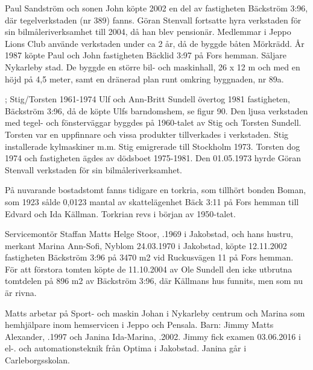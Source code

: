 Paul Sandström och sonen John köpte 2002 en del av fastigheten Bäckström 3:96, där tegelverkstaden (nr 389) fanns. Göran Stenvall fortsatte hyra	verkstaden för sin bilmåleriverksamhet till 2004, då han blev pensionär. Medlemmar i Jeppo Lions Club använde verkstaden under ca 2 år, då de 	byggde båten Mörkrädd. År 1987 köpte Paul och John fastigheten Bäcklid 3:97 på Fors hemman. Säljare Nykarleby stad. De byggde en större bil- och maskinhall, 26 x 12 m och med en höjd på 4,5 meter, samt en dränerad plan runt omkring byggnaden, nr 89a.

; Stig/Torsten	1961-1974
Ulf och Ann-Britt Sundell övertog 1981 fastigheten, Bäckström 3:96, då de köpte Ulfs barndomshem, se figur 90. Den ljusa verkstaden med 	tegel- och fönsterväggar byggdes på 1960-talet av Stig och Torsten Sundell. Torsten var en uppfinnare och vissa produkter tillverkades i 	verkstaden. Stig installerade kylmaskiner m.m. Stig emigrerade till Stockholm 1973. Torsten dog 1974 och fastigheten ägdes av dödsboet 	1975-1981. Den 01.05.1973 hyrde Göran Stenvall verkstaden för sin 	bilmåleriverksamhet.

På nuvarande bostadstomt fanns tidigare en torkria, som tillhört bonden	Boman, som 1923 sålde 0,0123 mantal av skattelägenhet Bäck 3:11 på 	Fors hemman till Edvard och Ida Källman. Torkrian revs i början av	1950-talet.



Servicemontör Staffan Matts Helge Stoor, .1969 i Jakobstad,	och hans hustru, merkant  Marina Ann-Sofi, \textborn Nyblom 24.03.1970 i Jakobstad, köpte 12.11.2002 fastigheten Bäckström 3:96 på 3470	m2  vid Ruckusvägen 11 på Fors hemman. För att förstora tomten köpte de 11.10.2004 av Ole Sundell den icke utbrutna tomtdelen på 896 m2 av Bäckström 3:96, där Källmans hus funnits, men som nu är rivna.


Matts arbetar på Sport- och maskin Johan i Nykarleby centrum och 	Marina som hemhjälpare inom hemservicen i Jeppo och Pensala.	Barn:	Jimmy Matts Alexander, .1997	och Janina Ida-Marina,	.2002.	Jimmy fick examen 03.06.2016 i el-. och automationsteknik från 	Optima i Jakobstad. Janina går i Carleborgsskolan.


